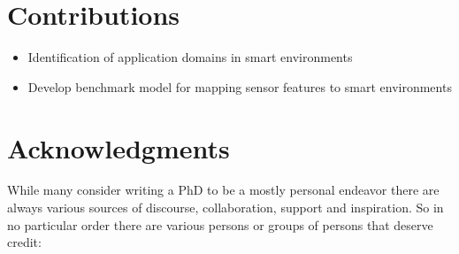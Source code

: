 \section{Contributions}
\begin{itemize}
\item Identification of application domains in smart environments
\item Develop benchmark model for mapping sensor features to smart environments
\end{itemize}

\section{Acknowledgments}
While many consider writing a PhD to be a mostly personal endeavor there are always various sources of discourse, collaboration, support and inspiration. 
So in no particular order there are various persons or groups of persons that deserve credit: 